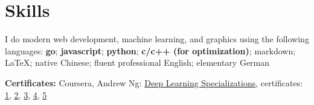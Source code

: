 \section{\textbf{Skills}}
\resumeSubHeadingListStart
\item{
  I do modern web development, machine learning, and graphics using the following languages:
  \textbf{go}; \textbf{javascript}; \textbf{python}; \textbf{c/c++ (for optimization)}; 
  markdown; \LaTeX; native Chinese; fluent professional English; elementary German
}
\item{
  \textbf{Certificates:}{
    Coursera, Andrew Ng: \href{https://www.coursera.org/account/accomplishments/specialization/QGH8ZVJ6J2L2}{Deep Learning Specializations}, certificates:
    \href{https://www.coursera.org/account/accomplishments/verify/YH4NT7HHN263}{1}, 
    \href{https://www.coursera.org/account/accomplishments/verify/QGH3GNGF6BM4}{2}, 
    \href{https://www.coursera.org/account/accomplishments/verify/6VU45R2SZEF6}{3},
    \href{https://www.coursera.org/account/accomplishments/verify/LF3K9BQQDLVL}{4},
    \href{https://www.coursera.org/account/accomplishments/verify/JQFLW2DPYAGW}{5}
  }
}
\resumeSubHeadingListEnd
